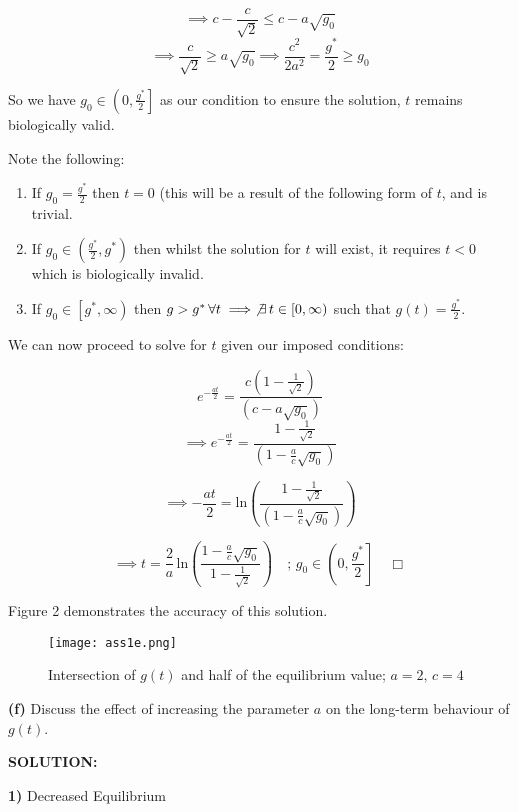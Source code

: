 \documentclass[]{article}
\begin{document}
\[
\implies c-\frac{c}{\sqrt{2}} \leq c-a \sqrt{g_0}
\]
\[
\implies \frac{c}{\sqrt{2}} \geq a \sqrt{g_0} \implies \frac{c^2}{2a^2} = \frac{g^*}{2}\geq g_0 
\]

So we have $g_0 \in \left(0,\frac{g^*}{2}\right]$ as our condition to ensure the solution, $t$ remains \indent biologically valid.\newline

Note the following:\begin{enumerate}
    \item If $g_0 = \frac{g^*}{2}$ then $t=0$ (this will be a result of the following form of $t$, and is trivial.
    \item If $g_0 \in (\frac{g^*}{2}, g^*)$ then whilst the solution for $t$ will exist, it requires $t<0$ which is biologically invalid.
    \item If $g_0 \in \left[g^*, \infty\right)$ then $g > g^* \, \forall t \implies \not\exists \, t \in \left[ 0,\infty\right) $ such that $g(t) = \frac{g^*}{2}$. 
\end{enumerate}

We can now proceed to solve for $t$ given our imposed conditions:

\[
e^{-\frac{at}{2}}  = \frac{c(1-\frac{1}{\sqrt{2}})}{ \left(c-a \sqrt{g_0}\right)}
\]
\[
\implies e^{-\frac{at}{2}}=\frac{1 -  \frac{1}{\sqrt{2}}}{ \left(1 - \frac{a}{c} \sqrt{g_0}\right)}
\]

\[
\implies   -\frac{at}{2}= \text{ln}\left( \frac{1 -  \frac{1}{\sqrt{2}}}{ \left(1 - \frac{a}{c} \sqrt{g_0}\right)} \right)
\]

\[
\implies t = \frac{2}{a}\,\text{ln}\left( \frac{1 - \frac{a}{c} \sqrt{g_0}}{1 -  \frac{1}{\sqrt{2}}} \right)\quad;\, g_0 \in \left(0,\frac{g^*}{2}\right] \quad \Box
\]

Figure 2 demonstrates the accuracy of this solution.

\begin{figure}[H]
    \centering
    \texttt{[image: ass1e.png]}
    \caption{Intersection of $g(t)$ and half of the equilibrium value; $a=2 ,\, c=4$}
    \label{fig:f(g)}
\end{figure}

\noindent \textbf{(f)} Discuss the effect of increasing the parameter $a$ on the long-term behaviour of $g(t)$.\newline

\noindent \textbf{SOLUTION:}\newline

\noindent \textbf{1)} Decreased Equilibrium \newline
\end{document}
